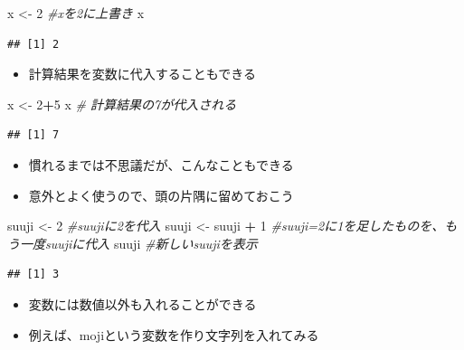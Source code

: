 \documentclass[
]{book}
\newenvironment{Shaded}{\begin{snugshade}}{\end{snugshade}}
\newcommand{\CommentTok}[1]{\textcolor[rgb]{0.56,0.35,0.01}{\textit{#1}}}
\newcommand{\DecValTok}[1]{\textcolor[rgb]{0.00,0.00,0.81}{#1}}
\newcommand{\NormalTok}[1]{#1}
\newcommand{\OtherTok}[1]{\textcolor[rgb]{0.56,0.35,0.01}{#1}}
\newcommand{\SpecialCharTok}[1]{\textcolor[rgb]{0.81,0.36,0.00}{\textbf{#1}}}
\providecommand{\tightlist}{%
  \setlength{\itemsep}{0pt}\setlength{\parskip}{0pt}}
\begin{document}
\begin{Shaded}
\begin{Highlighting}[]
\NormalTok{x }\OtherTok{\textless{}{-}} \DecValTok{2} \CommentTok{\#xを2に上書き}
\NormalTok{x}
\end{Highlighting}
\end{Shaded}

\begin{verbatim}
## [1] 2
\end{verbatim}

\begin{itemize}
\tightlist
\item
  計算結果を変数に代入することもできる
\end{itemize}

\begin{Shaded}
\begin{Highlighting}[]
\NormalTok{x }\OtherTok{\textless{}{-}} \DecValTok{2}\SpecialCharTok{+}\DecValTok{5} 
\NormalTok{x }\CommentTok{\# 計算結果の7が代入される}
\end{Highlighting}
\end{Shaded}

\begin{verbatim}
## [1] 7
\end{verbatim}

\begin{itemize}
\tightlist
\item
  慣れるまでは不思議だが、こんなこともできる
\item
  意外とよく使うので、頭の片隅に留めておこう
\end{itemize}

\begin{Shaded}
\begin{Highlighting}[]
\NormalTok{suuji }\OtherTok{\textless{}{-}} \DecValTok{2} \CommentTok{\#suujiに2を代入}
\NormalTok{suuji }\OtherTok{\textless{}{-}}\NormalTok{ suuji }\SpecialCharTok{+} \DecValTok{1} \CommentTok{\#suuji=2に1を足したものを、もう一度suujiに代入}
\NormalTok{suuji }\CommentTok{\#新しいsuujiを表示}
\end{Highlighting}
\end{Shaded}

\begin{verbatim}
## [1] 3
\end{verbatim}

\begin{itemize}
\tightlist
\item
  変数には数値以外も入れることができる
\item
  例えば、mojiという変数を作り文字列を入れてみる
\end{itemize}
\end{document}
